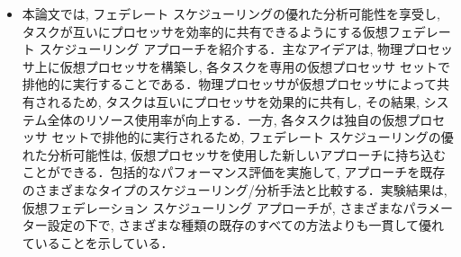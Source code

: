 \begin{frame}{}
    \begin{itemize}
        \item 本論文では, フェデレート スケジューリングの優れた分析可能性を享受し, タスクが互いにプロセッサを効率的に共有できるようにする仮想フェデレート スケジューリング アプローチを紹介する．主なアイデアは, 物理プロセッサ上に仮想プロセッサを構築し, 各タスクを専用の仮想プロセッサ セットで排他的に実行することである．物理プロセッサが仮想プロセッサによって共有されるため, タスクは互いにプロセッサを効果的に共有し, その結果, システム全体のリソース使用率が向上する．一方, 各タスクは独自の仮想プロセッサ セットで排他的に実行されるため, フェデレート スケジューリングの優れた分析可能性は, 仮想プロセッサを使用した新しいアプローチに持ち込むことができる．包括的なパフォーマンス評価を実施して, アプローチを既存のさまざまなタイプのスケジューリング/分析手法と比較する．実験結果は, 仮想フェデレーション スケジューリング アプローチが, さまざまなパラメーター設定の下で, さまざまな種類の既存のすべての方法よりも一貫して優れていることを示している．
    \end{itemize}
\end{frame}
